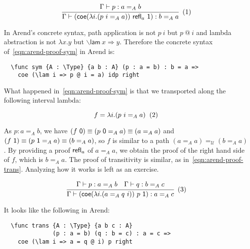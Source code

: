 \[
  \cfrac{
    \Gamma \vdash p : a =_A b
  }{
    \Gamma \vdash (\textsf{coe}
    (\lambda i. (p\ i =_A a)) \ \refl_a \ \textsf 1)
    : b =_A a
  }
  \xtag \label{eqn:arend-proof-sym}
\]

In Arend's concrete syntax, path application is not
$p\ i$ but $p\ @\ i$ and lambda abstraction is not $\lambda x.y$ but
$\backslash{}\textsf{lam} \ x \Rightarrow y$.
Therefore the concrete syntax of~\ref{eqn:arend-proof-sym} in Arend is:

\begin{verbatim}
  \func sym {A : \Type} {a b : A} (p : a = b) : b = a =>
    coe (\lam i => p @ i = a) idp right
\end{verbatim}

What happened in~\ref{eqn:arend-proof-sym} is that we transported
along the following interval lambda:

\[
  f = \lambda i. (p\ i =_A a)
  \xtag
\]

As $p : a =_A b$, we have
$(f \ \textsf 0) \equiv (p \ \textsf 0 =_A a) \equiv (a =_A a)$ and
$(f \ \textsf 1) \equiv (p \ \textsf 1 =_A a) \equiv (b =_A a)$,
so $f$ is similar to a path $(a =_A a) =_{\mathcal U} (b =_A a)$.
By providing a proof $\textsf{refl}_a$ of $a =_A a$,
we obtain the proof of the right hand side of $f$, which is $b =_A a$.
The proof of transitivity is similar, as in~\ref{eqn:arend-proof-trans}.
Analyzing how it works is left as an exercise.

\[
  \cfrac{
    \Gamma \vdash p : a =_A b
    \quad
    \Gamma \vdash q : b =_A c
  }{
    \Gamma \vdash (\textsf{coe}
    (\lambda i. (a =_A q\ i)) \ p \ \textsf 1)
    : a =_A c
  }
  \xtag \label{eqn:arend-proof-trans}
\]

It looks like the following in Arend:

\begin{verbatim}
  \func trans {A : \Type} {a b c : A}
              (p : a = b) (q : b = c) : a = c =>
    coe (\lam i => a = q @ i) p right
\end{verbatim}